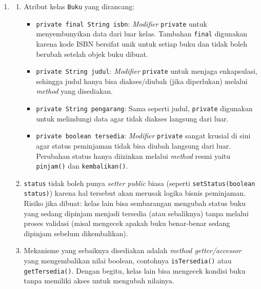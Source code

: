 \documentclass[11pt]{article}
\begin{document}
\begin{enumerate}
\begin{enumerate}[label=\alph*)]
          \item Membuat objek dan memanggil method \texttt{info}:
                \begin{verbatim}
class DemoKucing {
    public static void main(String[] args) {
        Kucing kucing = new Kucing("Mimi", 2, "Putih");
        kucing.info();
    }
}
                \end{verbatim}
        \end{enumerate}

  \item
        \begin{enumerate}[label=\alph*)]
          \item Atribut kelas \texttt{Buku} yang dirancang:
                \begin{itemize}
                  \item \texttt{private final String isbn}: \textit{Modifier} \texttt{private} untuk menyembunyikan data dari luar kelas. Tambahan \texttt{final} digunakan karena kode ISBN bersifat unik untuk setiap buku dan tidak boleh berubah setelah objek buku dibuat.
                  \item \texttt{private String judul}: \textit{Modifier} \texttt{private} untuk menjaga enkapsulasi, sehingga judul hanya bisa diakses/diubah (jika diperlukan) melalui \textit{method} yang disediakan.
                  \item \texttt{private String pengarang}: Sama seperti judul, \texttt{private} digunakan untuk melindungi data agar tidak diakses langsung dari luar.
                  \item \texttt{private boolean tersedia}: \textit{Modifier} \texttt{private} sangat krusial di sini agar status peminjaman tidak bisa diubah langsung dari luar. Perubahan status hanya diizinkan melalui \textit{method} resmi yaitu \texttt{pinjam()} dan \texttt{kembalikan()}.
                \end{itemize}

          \item \texttt{status} tidak boleh punya \textit{setter public} biasa (seperti \texttt{setStatus(boolean status)}) karena hal tersebut akan merusak logika bisnis peminjaman. Risiko jika dibuat: kelas lain bisa sembarangan mengubah status buku yang sedang dipinjam menjadi tersedia (atau sebaliknya) tanpa melalui proses validasi (misal mengecek apakah buku benar-benar sedang dipinjam sebelum dikembalikan).

          \item Mekanisme yang sebaiknya disediakan adalah \textit{method getter/accessor} yang mengembalikan nilai boolean, contohnya \texttt{isTersedia()} atau \texttt{getTersedia()}. Dengan begitu, kelas lain bisa mengecek kondisi buku tanpa memiliki akses untuk mengubah nilainya.
        \end{enumerate}
\end{enumerate}
\end{document}
